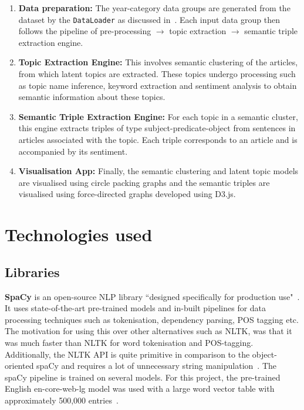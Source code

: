 \begin{enumerate}
    \item \textbf{Data preparation:} The year-category data groups are generated from the dataset by the \texttt{DataLoader} as discussed in~. Each input data group then follows the pipeline of pre-processing $\rightarrow$ topic extraction $\rightarrow$ semantic triple extraction engine. 
    
    \item \textbf{Topic Extraction Engine:} This involves semantic clustering of the articles, from which latent topics are extracted. These topics undergo processing such as topic name inference, keyword extraction and sentiment analysis to obtain semantic information about these topics.
    
    \item \textbf{Semantic Triple Extraction Engine:} For each topic in a semantic cluster, this engine extracts triples of type subject-predicate-object from sentences in articles associated with the topic. Each triple corresponds to an article and is accompanied by its sentiment.
    
    \item \textbf{Visualisation App:} Finally, the semantic clustering and latent topic models are visualised using circle packing graphs and the semantic triples are visualised using force-directed graphs developed using D3.js. 
    

\end{enumerate}
\section{Technologies used}
\vspace{-1ex}
\subsection{Libraries} \label{libraries}

\textbf{SpaCy} is an open-source NLP library ``designed specifically for production use"~\cite{spacy}. It uses state-of-the-art pre-trained models and in-built pipelines for data processing techniques such as tokenisation, dependency parsing, POS tagging etc. The motivation for using this over other alternatives such as NLTK, was that it was much faster than NLTK for word tokenisation and POS-tagging. Additionally, the NLTK API is quite primitive in comparison to the object-oriented spaCy and requires a lot of unnecessary string manipulation~\cite{spacy-nltk}. The spaCy pipeline is trained on several models. For this project, the pre-trained English en-core-web-lg model was used with a large word vector table with approximately 500,000 entries~\cite{spacy}.  

